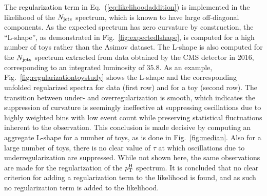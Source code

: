The regularization term in Eq.~(\ref{eq:likelihoodaddition}) is implemented in the likelihood of the $N_\text{jets} $ spectrum, which is known to have large off-diagonal components.
% 
As the expected spectrum has zero curvature by construction, the ``L-shape'', as demonstrated in Fig.~\ref{fig:expectedlshape}, is computed for a high number of toys rather than the Asimov dataset.
% 
The L-shape is also computed for the $N_\text{jets} $ spectrum extracted from data obtained by the CMS detector in 2016, corresponding to an integrated luminosity of $35.8$\fbinv.
% 
As an example, Fig.~\ref{fig:regularizationtoystudy} shows the L-shape and the corresponding unfolded regularized spectra for data (first row) and for a toy (second row).
% 
The transition between under- and overregularization is smooth, which indicates the suppression of curvature is seemingly ineffective at suppressing oscillations due to highly weighted bins with low event count while preserving statistical fluctuations inherent to the observation.
% 
This conclusion is made decisive by computing an aggregate L-shape for a number of toys, as is done in Fig.~\ref{fig:median}.
% 
Also for a large number of toys, there is no clear value of $\tau$ at which oscillations due to underregularization are suppressed.
% 
While not shown here, the same observations are made for the regularization of the $p_\mathrm{T}^\mathrm{H}$ spectrum.
%
It is concluded that no clear criterion for adding a regularization term to the likelihood is found, and as such no regularization term is added to the likelihood.


